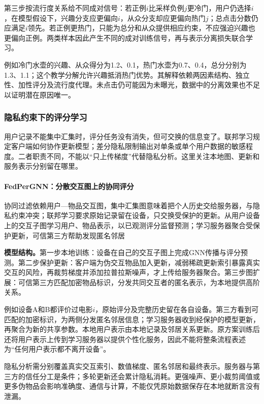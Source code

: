 第三步按流行度关系给不同成对信号：若正例$i$比采样负例$j$更冷门，用户仍选择$i$，在模型假设下，兴趣分支应更偏向$i$，从众分支却应更偏向热门$j$；总点击分数仍应满足$i$领先。若正例更热门，只能为总分和从众提供相应约束，不应强迫兴趣也更偏向正例。两类样本因此产生不同的成对训练信号，再与表示分离损失联合学习。

例如冷门水壶的兴趣、从众得分为1.2、0.1，热门水壶为0.7、0.4，总分分别为1.3、1.1；这个教学分解允许兴趣抵消热门优势。其解释依赖两因素结构、独立性、加性评分及流行度代理。未点击仍可能因为未曝光，数据中的分离效果也不足以证明潜在原因唯一。

\subsubsection{隐私约束下的评分学习}
\label{sec:rs-private-scoring}

用户记录不能集中汇集时，评分任务没有消失，但可交换的信息变了。联邦学习规定客户端如何协作更新模型；差分隐私限制输出对单条或单个用户数据的敏感程度。二者职责不同，不能以“只上传梯度”代替隐私分析。这里关注本地图、更新和服务表示分别留在哪里。

\paragraph{FedPerGNN：分散交互图上的协同评分}
\label{sec:rs-fedpergnn}

协同过滤依赖用户—物品交互图，集中汇集图意味着把个人历史交给服务器，与隐私约束冲突；联邦学习要求原始记录留在设备，只交换受保护的更新。从用户设备上的交互子图学习用户、物品表示，以已观测评分监督预测；学习服务器聚合受保护更新，可信第三方帮助发现匿名邻居

\textbf{模型结构。}第一步本地训练：设备在自己的交互子图上完成GNN传播与评分预测。第二步保护更新：客户端为伪交互物品加入更新，减弱稀疏更新索引暴露真实交互的风险，再裁剪梯度并添加拉普拉斯噪声，才上传给服务器聚合。第三步图扩展：可信第三方匹配加密物品标识，分发共同交互者的匿名表示，为本地提供高阶关系。

例如设备A和B都评价过电影$i$，原始评分及完整历史留在各自设备。第三方看到可匹配的加密标识，为两侧分发匿名邻居信息；学习服务器收到经保护的模型更新，再聚合为新的共享参数。本地用户表示由本地记录及邻居关系更新。原方案训练后还将用户表示上传到学习服务器以提供个性化服务，因此不能将整条流程表述为“任何用户表示都不离开设备”。

隐私分析需分别覆盖真实交互索引、数值梯度、匿名邻居和最终表示。服务器与第三方的信任分工是条件；多轮更新还会累计隐私消耗。更强噪声、更小裁剪阈值或更多伪物品会影响准确度、通信与计算，不能仅凭原始数据保存在本地就断言没有泄漏。

